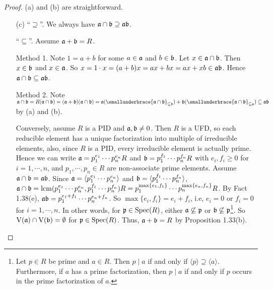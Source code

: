 \begin{proof}
    (a) and (b) are straightforward.
    \begin{enumerate}
        \item [(c)]
            ``$\supseteq$''. We always have $\mathfrak{a} \cap \mathfrak{b} \supseteq \mathfrak{a} \mathfrak{b}$. \par 
            ``$\subseteq$''. Assume $\mathfrak{a} + \mathfrak{b} = R$.  \par 
            Method 1. Note $1 = a+b$ for some $a \in \mathfrak{a}$ and $b \in \mathfrak{b}$. Let $x \in \mathfrak{a} \cap \mathfrak{b}$. Then $x \in \mathfrak{b}$ and $x \in \mathfrak{a}$. So $x = 1 \cdot x = (a+b)x = ax + bx = ax + xb \in \operatorname{\mathfrak{a} \mathfrak{b}}$. Hence $\mathfrak{a} \cap \mathfrak{b} \subseteq \mathfrak{a} \mathfrak{b}$. \par 
            Method 2. Note $\ffa \cap \ffb = R(\ffa \cap \ffb) = (\ffa + \ffb)(\ffa \cap \ffb) = \ffa(\smallunderbrace{\ffa \cap \ffb}_{\subseteq \ffb}) + \ffb(\smallunderbrace{\ffa \cap \ffb}_{\subseteq \ffa}) \subseteq \ffa \ffb$ by (a) and (b). \par
            Conversely, assume $R$ is a PID and $\mathfrak{a},\mathfrak{b} \neq 0$. Then $R$ is a UFD, so each reducible element has a unique factorization into multiple of irreducible elements, also, since $R$ is a PID, every irreducible element is actually prime.  Hence we can write $\mathfrak{a} = p_1^{e_1} \cdots p_n^{e_n} R$ and $\mathfrak{b} = p_1^{f_1} \cdots p_n^{f_n}R$ with $e_i,f_i \geq 0$ for $i = 1,\cdots,n$, and $p_1,\cdots,p_n \in R$ are non-associate prime elements. Assume $\mathfrak{a} \cap \mathfrak{b} = \mathfrak{a} \mathfrak{b}$. Since $\mathfrak{a} = \langle p_1^{e_1} \cdots p_n^{e_n} \rangle$ and $\mathfrak{b} = \langle p_1^{f_1} \cdots p_n^{f_n} \rangle$, $\mathfrak{a} \cap \mathfrak{b} = \operatorname{lcm}(p_1^{e_1} \cdots p_n^{e_n},p_1^{f_1} \cdots p_n^{f_n})R = p_1^{\max\{e_1,f_1\}} \cdots p_n^{\max\{e_n,f_n\}}R$. By Fact 1.38(e), $\mathfrak{a}\mathfrak{b} = p_1^{e_1+f_1} \cdots p_n^{e_n+f_n}$. So $\max\{e_i,f_i\} = e_i + f_i$, i.e, $e_i = 0$ or $f_i = 0$ for $i = 1,\cdots,n$. In other words, for $\mathfrak{p} \in \operatorname{Spec}(R)$, either $\mathfrak{a} \not \subseteq \mathfrak{p}$ or $\mathfrak{b} \not \subseteq \mathfrak{p}$\footnote[2]{Let $p \in R$ be prime and $a \in R$. Then $p \mid a$ if and only if $\langle p \rangle \supseteq \langle a \rangle$. Furthermore, if $a$ has a prime factorization, then $p \mid a$ if and only if $p$ occurs in the prime factorization of $a$.}. So $\operatorname{V}(\mathfrak{a}) \cap \operatorname{V}(\mathfrak{b}) = \emptyset$ for $\mathfrak{p} \in \operatorname{Spec}(R)$. Thus, $\mathfrak{a} + \mathfrak{b} = R$ by Proposition 1.33(b). \qedhere
    \end{enumerate}
\end{proof}

